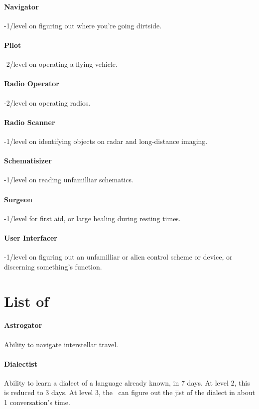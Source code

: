 \paragraph{Navigator}
-1/level on figuring out where you're going dirtside.

\paragraph{Pilot}
-2/level on operating a flying vehicle.

\paragraph{Radio Operator}
-2/level on operating radios.

\paragraph{Radio Scanner}
-1/level on identifying objects on radar and long-distance imaging.

\paragraph{Schematisizer}
-1/level on reading unfamilliar schematics.

\paragraph{Surgeon}
-1/level for first aid, or large healing during resting times.

\paragraph{User Interfacer}
-1/level on figuring out an unfamilliar or alien control scheme or device, or discerning something's function.

\section{List of \abilityPC}

\paragraph{Astrogator}
Ability to navigate interstellar travel.

\paragraph{Dialectist}
Ability to learn a dialect of a language already known, in 7 days. At level 2, this is reduced to 3 days. At level 3, the \pc\, can figure out the jist of the dialect in about 1 conversation's time.